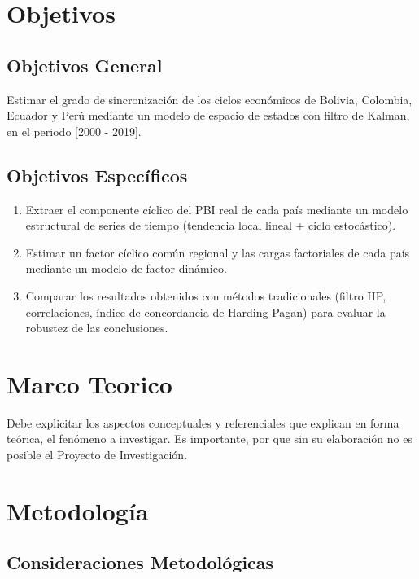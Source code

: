 \documentclass[
  spanish,
  11pt,
  letterpaper,
  letterpaper,
  12pt]{book}
\begin{document}
\chapter{Objetivos}\label{objetivos}

\section{Objetivos General}\label{objetivos-general}

Estimar el grado de sincronización de los ciclos económicos de Bolivia,
Colombia, Ecuador y Perú mediante un modelo de espacio de estados con
filtro de Kalman, en el periodo {[}2000 - 2019{]}.

\section{Objetivos Específicos}\label{objetivos-especuxedficos}

\begin{enumerate}
\def\labelenumi{\arabic{enumi}.}
\item
  Extraer el componente cíclico del PBI real de cada país mediante un
  modelo estructural de series de tiempo (tendencia local lineal + ciclo
  estocástico).
\item
  Estimar un factor cíclico común regional y las cargas factoriales de
  cada país mediante un modelo de factor dinámico.
\item
  Comparar los resultados obtenidos con métodos tradicionales (filtro
  HP, correlaciones, índice de concordancia de Harding-Pagan) para
  evaluar la robustez de las conclusiones.
\end{enumerate}

\chapter{Marco Teorico}\label{marco-teorico}

Debe explicitar los aspectos conceptuales y referenciales que explican
en forma teórica, el fenómeno a investigar. Es importante, por que sin
su elaboración no es posible el Proyecto de Investigación.

\chapter{Metodología}\label{metodologuxeda}

\section{Consideraciones
Metodológicas}\label{consideraciones-metodoluxf3gicas}
\end{document}
